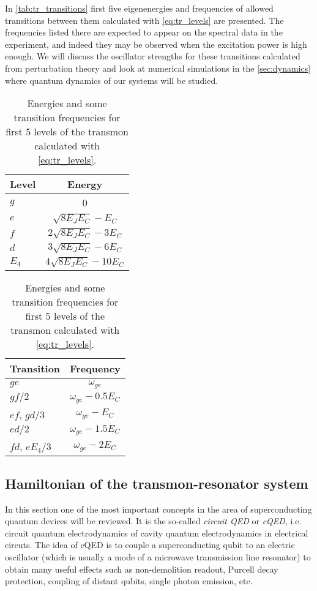 \documentclass[12pt, twoside]{report}
\numberwithin{equation}{section}
\begin{document}
In \autoref{tab:tr_transitions} first five eigenenergies and frequencies of allowed transitions between them calculated with \eqref{eq:tr_levels} are presented. The frequencies listed there are expected to appear on the spectral data in the experiment, and indeed they may be observed when the excitation power is high enough. We will discuss the oscillator strengths for these transitions calculated from perturbation theory and look at numerical simulations in the \autoref{sec:dynamics} where quantum dynamics of our systems will be studied.

\begin{table}
\centering
\begin{tabular}{l|c}
Level & Energy\\
\hline
$g$ & 0\\
$e$ & $\sqrt{8E_J E_C} - E_C$\\
$f$ & $2\sqrt{8E_J E_C} - 3 E_C$\\
$d$ & $3\sqrt{8E_J E_C} - 6 E_C$\\
$E_4$ & $4\sqrt{8E_J E_C} - 10 E_C$\\
\hline
\end{tabular}\quad
\begin{tabular}{l|c}
Transition & Frequency\\
\hline
$ge$ & $\omega_{ge}$ \\
$gf/2$ & $\omega_{ge} - 0.5 E_C$\\
$ef$, $gd/3$& $\omega_{ge}-E_C$\\
$ed/2$ & $\omega_{ge} - 1.5 E_C$\\
$fd$, $e E_4/3$ & $\omega_{ge}-2 E_C$\\
\hline
\end{tabular}
\caption{Energies and some transition frequencies for first 5 levels of the transmon calculated with \eqref{eq:tr_levels}.}
\label{tab:tr_transitions}
\end{table}

\subsection{Hamiltonian of the transmon-resonator system}

In this section one of the most important concepts in the area of superconducting quantum devices will be reviewed. It is the so-called \textit{circuit QED} or \textit{cQED}, i.e. circuit quantum electrodynamics of cavity quantum electrodynamics in electrical circuts\cite{Blais2004}. The idea of cQED is to couple a superconducting qubit to an electric oscillator (which is usually a mode of a microwave transmission line resonator) to obtain many useful effects such as non-demolition readout\cite{Blais2004}, Purcell decay protection\cite{Koch2007}, coupling of distant qubits\cite{Majer2007}, single photon emission\cite{bozyigit2011}, etc.
\end{document}
